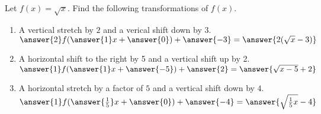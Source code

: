 \documentclass{ximera}
\author{David Kish}
\begin{document}
\begin{exercise}
Let $f(x) = \sqrt{x}$.  Find the following transformations of $f(x)$.
\begin{enumerate}
\item A vertical stretch by $2$ and a verical shift down by $3$.\\ 
$\answer{2}f(\answer{1}x+\answer{0})+\answer{-3} = \answer{2(\sqrt{x}-3)}$
\item A horizontal shift to the right by 5 and a vertical shift up by 2.\\ 
$\answer{1}f(\answer{1}x+\answer{-5})+\answer{2} = \answer{\sqrt{x-5}+2}$
\item A horizontal stretch by a factor of $5$ and a vertical shift down by $4$.\\ 
$\answer{1}f(\answer{\frac{1}{5}}x+\answer{0})+\answer{-4} = \answer{\sqrt{\frac{1}{5}x}-4}$
\end{enumerate}
\end{exercise}
\end{document}
